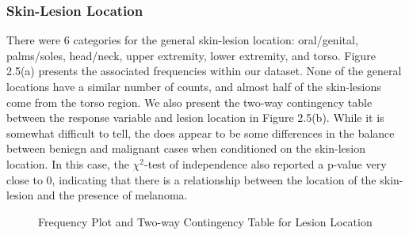 \documentclass [MAS] {uclathes}
\begin{document}
\subsubsection*{Skin-Lesion Location}

There were 6 categories for the general skin-lesion location: oral/genital, palms/soles, head/neck, upper extremity, lower extremity, and torso. Figure 2.5(a) presents the associated frequencies within our dataset. None of the general locations have a similar number of counts, and almost half of the skin-lesions come from the torso region. We also present the two-way contingency table between the response variable and lesion location in Figure 2.5(b). While it is somewhat difficult to tell, the does appear to be some differences in the balance between beniegn and malignant cases when conditioned on the skin-lesion location. In this case, the $\chi^2$-test of independence also reported a p-value very close to 0, indicating that there is a relationship between the location of the skin-lesion and the presence of melanoma.

\begin{figure}[h!tbp]
    \hspace*{\fill}
    \centering
    \hspace{1em}
    \hspace*{\fill}
    \label{fig:loc_eda_tab}
    \vspace{0cm}
    \caption{Frequency Plot and Two-way Contingency Table for Lesion Location}
    \end{figure}
\end{document}
